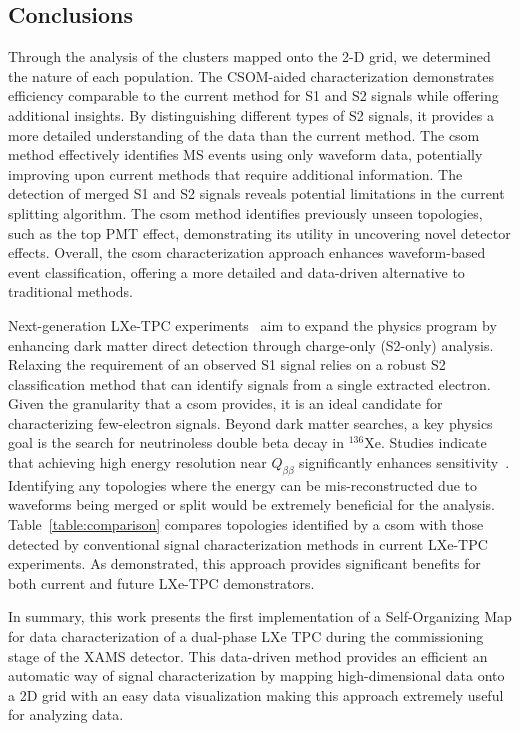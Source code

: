 \subsection{Conclusions}
\label{sec:discussion}

Through the analysis of the clusters mapped onto the 2-D grid, we determined the nature of each population. The CSOM-aided characterization demonstrates efficiency comparable to the current method for S1 and S2 signals while offering additional insights. By distinguishing different types of S2 signals, it provides a more detailed understanding of the data than the current method. The \acrshort{csom} method effectively identifies MS events using only waveform data, potentially improving upon current methods that require additional information. The detection of merged S1 and S2 signals reveals potential limitations in the current splitting algorithm. The \acrshort{csom} method identifies previously unseen topologies, such as the top PMT effect, demonstrating its utility in uncovering novel detector effects. Overall, the \acrshort{csom} characterization approach enhances waveform-based event classification, offering a more detailed and data-driven alternative to traditional methods.

Next-generation LXe-TPC experiments~\cite{Darwin2023, Baudis:2024jnk} aim to expand the physics program by enhancing dark matter direct detection through charge-only (S2-only) analysis. Relaxing the requirement of an observed S1 signal relies on a robust S2 classification method that can identify signals from a single extracted electron. Given the granularity that a \acrshort{csom} provides, it is an ideal candidate for characterizing few-electron signals. Beyond dark matter searches, a key physics goal is the search for neutrinoless double beta decay in $^{136}$Xe. Studies indicate that achieving high energy resolution near $Q_{\beta\beta}$ significantly enhances sensitivity~\cite{PhysRevLett.120.072701,1Tenergyres}. Identifying any topologies where the energy can be mis-reconstructed due to waveforms being merged or split would be extremely beneficial for the analysis. Table~\ref{table:comparison} compares topologies identified by a \acrshort{csom} with those detected by conventional signal characterization methods in current LXe-TPC experiments. As demonstrated, this approach provides significant benefits for both current and future LXe-TPC demonstrators.

In summary, this work presents the first implementation of a Self-Organizing Map for data characterization of a dual-phase LXe TPC during the commissioning stage of the XAMS detector. This data-driven method provides an efficient an automatic way of
signal characterization by mapping high-dimensional data
onto a 2D grid with an easy data visualization making this approach extremely useful for analyzing data.

\newpage